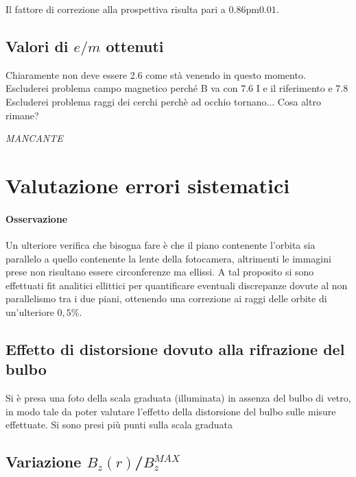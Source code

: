 \documentclass[10pt,a4paper]{article}
\begin{document}
Il fattore di correzione alla prospettiva risulta pari a $\unit{0.86 \pm 0.01}{}$.

\subsection{Valori di $e/m$ ottenuti}
Chiaramente non deve essere 2.6 come stà venendo in questo momento.
Escluderei problema campo magnetico perché B va con 7.6 I e il riferimento e 7.8
Escluderei problema raggi dei cerchi perchè ad occhio tornano...
Cosa altro rimane? 



\emph{MANCANTE}

\section{Valutazione errori sistematici}

\paragraph{Osservazione}
Un ulteriore verifica che bisogna fare è che il piano contenente l'orbita sia parallelo a quello contenente la lente della fotocamera, altrimenti le immagini prese non risultano essere circonferenze ma ellissi. A tal proposito si sono effettuati fit analitici ellittici per quantificare eventuali discrepanze dovute al non parallelismo tra i due piani, ottenendo una correzione ai raggi delle orbite di un'ulteriore $0,5\%$.

\subsection{Effetto di distorsione dovuto alla rifrazione del bulbo}
Si è presa una foto della scala graduata (illuminata) in assenza del bulbo di vetro, in modo tale da poter valutare l'effetto della distorsione del bulbo sulle misure effettuate. Si sono presi più punti sulla scala graduata 

\subsection{Variazione $B_z(r)$/$B_z^{MAX}$}
\end{document}
